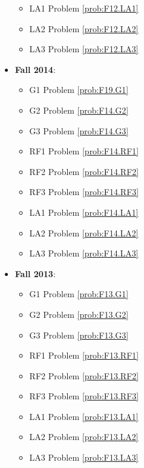 \documentclass{article}
\theoremstyle{definition}
\begin{document}
\begin{itemize}
\begin{itemize}
	\item LA1 Problem \ref{prob:F12.LA1}
	\item LA2 Problem \ref{prob:F12.LA2}
	\item LA3 Problem \ref{prob:F12.LA3}	
	\end{itemize}	
	\item \textbf{Fall 2014}:  
	\begin{itemize}
	\item G1 Problem \ref{prob:F19.G1} 
	\item G2 Problem \ref{prob:F14.G2} 
	\item G3 Problem \ref{prob:F14.G3}
	\item RF1 Problem \ref{prob:F14.RF1}
	\item RF2 Problem \ref{prob:F14.RF2}
	\item RF3 Problem \ref{prob:F14.RF3}
	\item LA1 Problem \ref{prob:F14.LA1}
	\item LA2 Problem \ref{prob:F14.LA2}
	\item LA3 Problem \ref{prob:F14.LA3}
	\end{itemize}
	\item \textbf{Fall 2013}:  
	\begin{itemize}
	\item G1 Problem \ref{prob:F13.G1} 
	\item G2 Problem \ref{prob:F13.G2} 
	\item G3 Problem \ref{prob:F13.G3}
	\item RF1 Problem \ref{prob:F13.RF1}
	\item RF2 Problem \ref{prob:F13.RF2}
	\item RF3 Problem \ref{prob:F13.RF3}
	\item LA1 Problem \ref{prob:F13.LA1}
	\item LA2 Problem \ref{prob:F13.LA2}
	\item LA3 Problem \ref{prob:F13.LA3}
	\end{itemize}


\end{itemize}
\end{document}
